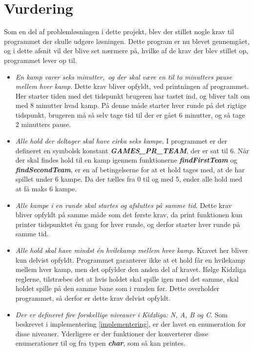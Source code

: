 \chapter{Vurdering}\label{ch:chlabel}
Som en del af problemløsningen i dette projekt, blev der stillet nogle krav til programmet der skulle udgøre løsningen. Dette program er nu blevet gennemgået, og i dette afsnit vil der blive set nærmere på, hvilke af de krav der blev stillet op, programmet lever op til.
\begin{itemize}
    \item \textit{En kamp varer seks minutter,\ og der skal være en til to minutters pause mellem hver kamp}. Dette krav bliver opfyldt, ved printningen af programmet. Her starter tiden med det tidspunkt brugeren har tastet ind, og bliver talt om med 8 minutter hvad kamp. På denne måde starter hver runde på det rigtige tidspunkt, brugeren må så selv tage tid til der er gået 6 minutter, og så tage 2 minutters pause.
    \item \textit{Alle hold der deltager skal have cirka seks kampe.} I programmet er der defineret en symbolsk konstant \textbf{\textit{GAMES\_PR\_TEAM}}, der er sat til 6. Når der skal findes hold til en kamp igennem funktionerne \textbf{\textit{findFirstTeam}} og \textbf{\textit{findSecondTeam}}, er en af betingelserne for at et hold tages med, at de har spillet under 6 kampe. Da der tælles fra 0 til og med 5, ender alle hold med at få maks 6 kampe.
    \item \textit{Alle kampe i en runde skal startes og afsluttes på samme tid}. Dette krav bliver opfyldt på samme måde som det første krav, da print funktionen kun printer tidspunktet én gang for hver runde, og derfor starter hver runde på samme tid.
    \item \textit{Alle hold skal have mindst én hvilekamp mellem hver kamp}. Kravet her bliver kun delvist opfyldt. Programmet garanterer ikke at et hold får en hvilekamp mellem hver kamp, men det opfylder den anden del af kravet. Ifølge Kidzliga reglerne, tilstræbes det at hvis holdet skal spille igen med det samme, skal holdet spille på den samme bane som i runden før. Dette overholder programmet, så derfor er dette krav delvist opfyldt.
    \item \textit{Der er defineret fire forskellige niveauer i Kidzliga: N, A, B og C}. Som beskrevet i implementering \ref{implementering}, er der lavet en enumeration for disse niveauer. Yderligere er der funktioner der konverterer disse enumerationer til og fra typen \textbf{\textit{char}}, som så kan printes.

\end{itemize}
